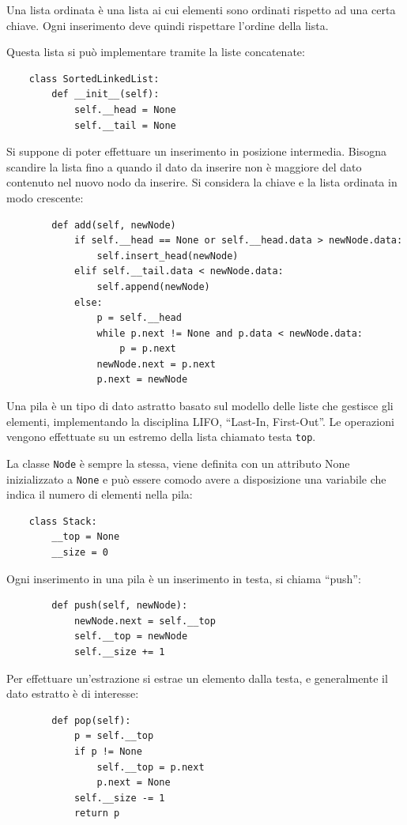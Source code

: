 \documentclass{article}
\numberwithin{equation}{subsection}
\begin{document}
Una lista ordinata è una lista ai cui elementi sono ordinati rispetto ad una certa chiave. 
Ogni inserimento deve quindi rispettare l'ordine della lista. 

Questa lista si può implementare tramite la liste concatenate:
\begin{verbatim}    
    class SortedLinkedList:
        def __init__(self):
            self.__head = None
            self.__tail = None
\end{verbatim}

Si suppone di poter effettuare un inserimento in posizione intermedia. Bisogna scandire la 
lista fino a quando il dato da inserire non è maggiore del dato contenuto nel nuovo nodo 
da inserire. Si considera la chiave e la lista ordinata in modo crescente:
\begin{verbatim}
        def add(self, newNode)
            if self.__head == None or self.__head.data > newNode.data:
                self.insert_head(newNode)
            elif self.__tail.data < newNode.data:
                self.append(newNode)
            else: 
                p = self.__head
                while p.next != None and p.data < newNode.data:
                    p = p.next
                newNode.next = p.next
                p.next = newNode
\end{verbatim}

Una pila è un tipo di dato astratto basato sul modello delle liste che gestisce 
gli elementi, implementando la disciplina LIFO, ``Last-In, First-Out''. 
Le operazioni vengono effettuate su un estremo della lista chiamato testa \verb|top|. 

La classe \verb|Node| è sempre la stessa, viene definita con un attributo None 
inizializzato a \verb|None| e può essere comodo avere a disposizione una variabile che indica 
il numero di elementi nella pila:
\begin{verbatim}
    class Stack:
        __top = None
        __size = 0
\end{verbatim}

Ogni inserimento in una pila è un inserimento in testa, si chiama ``push'':
\begin{verbatim}
        def push(self, newNode):
            newNode.next = self.__top
            self.__top = newNode
            self.__size += 1
\end{verbatim}

Per effettuare un'estrazione si estrae un elemento dalla testa, e generalmente il dato 
estratto è di interesse:
\begin{verbatim}
        def pop(self):
            p = self.__top
            if p != None
                self.__top = p.next
                p.next = None
            self.__size -= 1
            return p
\end{verbatim}
\end{document}
